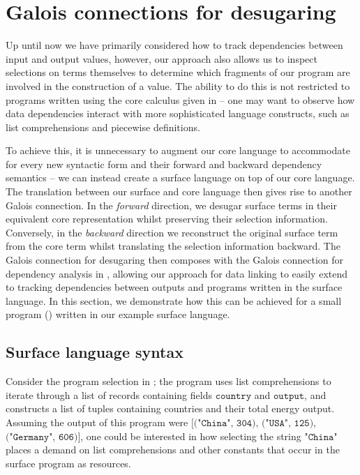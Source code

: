 \newpage
\section{Galois connections for desugaring}
\label{sec:surface-language}

Up until now we have primarily considered how to track dependencies between input and output values, however, our approach also allows us to inspect selections on terms themselves to determine which fragments of our program are involved in the construction of a value. The ability to do this is not restricted to programs written using the core calculus given in  -- one may want to observe how data dependencies interact with more sophisticated language constructs, such as list comprehensions and piecewise definitions.

To achieve this, it is unnecessary to augment our core language to accommodate for every new syntactic form and their forward and backward dependency semantics -- we can instead create a surface language on top of our core language. The translation between our surface and core language then gives rise to another Galois connection. In the \textit{forward} direction, we desugar surface terms in their equivalent core representation whilst preserving their selection information. Conversely, in the \textit{backward} direction we reconstruct the original surface term from the core term whilst translating the selection information backward. The Galois connection for desugaring then composes with the Galois connection for dependency analysis in , allowing our approach for data linking to easily extend to tracking dependencies between outputs and programs written in the surface language. In this section, we demonstrate how this can be achieved for a small program () written in our example surface language.



\subsection{Surface language syntax}

Consider the program selection in ; the program uses list comprehensions to iterate through a list of records containing fields $\texttt{country}$ and $\texttt{output}$, and constructs a list of tuples containing countries and their total energy output. Assuming the output of this program were $\texttt{[("China", 304), ("USA", 125),}$ $\texttt{("Germany", 606)]}$, one could be interested in how selecting the string $\texttt{"China"}$ places a demand on list comprehensions and other constants that occur in the surface program as resources.

